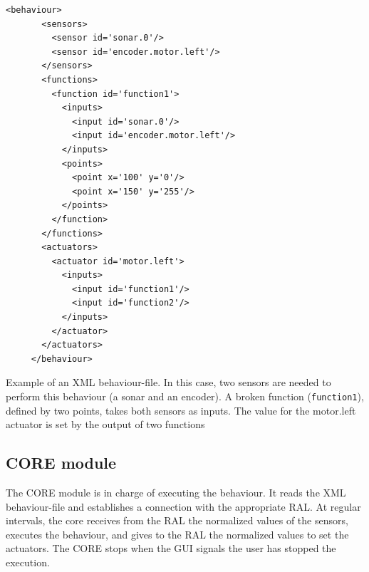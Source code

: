 \begin{table}[ht!]
\footnotesize
\begin{Verbatim}[frame=single]
     <behaviour> 
       <sensors>
         <sensor id='sonar.0'/>
         <sensor id='encoder.motor.left'/>
       </sensors>
       <functions>
         <function id='function1'>
           <inputs>
             <input id='sonar.0'/>
             <input id='encoder.motor.left'/>
           </inputs>
           <points>
             <point x='100' y='0'/>
             <point x='150' y='255'/>
           </points>
         </function>
       </functions>
       <actuators>
         <actuator id='motor.left'>
           <inputs>
             <input id='function1'/>
             <input id='function2'/>
           </inputs>
         </actuator>
       </actuators>
     </behaviour>
\end{Verbatim}
\normalsize
\caption{Example of an XML behaviour-file. In this case, two sensors are needed to perform this behaviour (a sonar and an encoder). A broken function (\texttt{function1}), defined by two points, takes both sensors as inputs. The value for the motor.left actuator is set by the output of two functions}
\label{xml}
\end{table}



\subsection{CORE module}

The CORE module is in charge of executing the behaviour. It reads the XML behaviour-file and establishes a connection with the appropriate RAL. At regular intervals, the core receives from the RAL the normalized values of the sensors, executes the behaviour, and gives to the RAL the normalized values to set the actuators. The CORE stops when the GUI signals the user has stopped the execution. 

